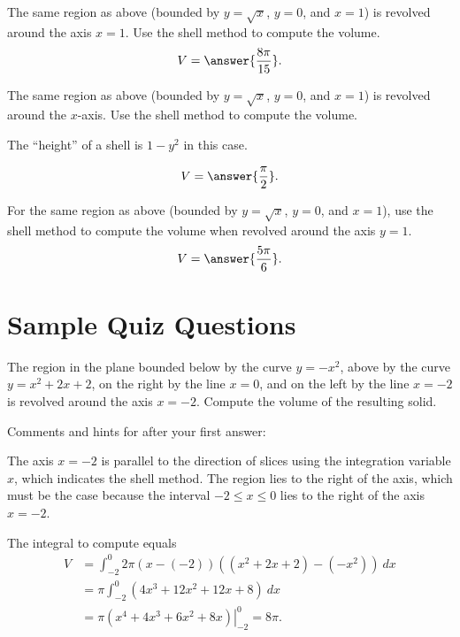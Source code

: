 \documentclass{ximera}
\begin{document}
\begin{exercise}
The same region as above (bounded by $y = \sqrt{x}$, $y=0$, and $x = 1$) is revolved around the axis $x=1$. Use the shell method to compute the volume.
\[ V = \answer{\frac{8 \pi}{15}}. \]
\end{exercise}

\begin{exercise}
The same region as above  (bounded by $y = \sqrt{x}$, $y=0$, and $x = 1$) is revolved around the $x$-axis. Use the shell method to compute the volume.
\begin{hint}
The ``height'' of a shell is $1-y^2$ in this case.
\end{hint}
\[ V = \answer{\frac{\pi}{2}}. \]
\end{exercise}

\begin{exercise}
For the same region as above (bounded by $y = \sqrt{x}$, $y=0$, and $x = 1$), use the shell method to compute the volume when revolved around the axis $y = 1$.
\[ V = \answer{\frac{5 \pi}{6}}. \]
\end{exercise}

\section*{Sample Quiz Questions}

\begin{question}%

The region in the plane bounded below by the curve \(y=-x^2\), above by the curve \(y=x^2+2x+2\), on the right by the line  \(x = 0\), and on the left by the line \(x = -2\) is revolved around the axis \(x = -2\). Compute the volume of the resulting solid.
\begin{multiplechoice}
\choice{\(4\pi\)}
\choice{\(6\pi\)}
\choice[correct]{\(8\pi\)}
\choice{\(10\pi\)}
\choice{\(12\pi\)}
\choice{\(14\pi\)}
\end{multiplechoice}
Comments and hints for after your first answer:
\begin{feedback}
The axis \(x = -2\) is parallel to the direction of slices using the integration variable \(x\), which indicates the shell method. 
 The region lies to the right of the axis, which must be the case because the interval \(-2 \leq x \leq 0\) lies to the right of the axis \(x = -2\).
 \begin{hint}
The integral to compute equals \[ \begin{aligned} V &= \int_{-2}^{0}2 \pi (x-(-2))((x^2+2x+2)-(-x^2))~ dx\\
& = \pi \int_{-2}^{0} (4x^3+12x^2+12x+8)~ dx\\
& = \pi \left. \left(x^4+4x^3+6x^2+8x\right) \right|_{-2}^{0} = 8\pi. \end{aligned}\]
\end{hint}
\end{feedback}

\end{question}
\end{document}

